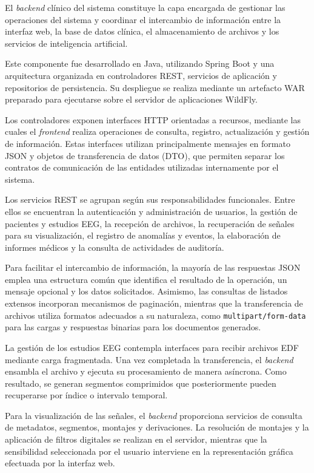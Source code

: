 El \textit{backend} clínico del sistema constituye la capa
encargada de gestionar las operaciones del sistema y
coordinar el intercambio de información entre la interfaz
web, la base de datos clínica, el almacenamiento de
archivos y los servicios de inteligencia artificial.

Este componente fue desarrollado en Java, utilizando
Spring Boot y una arquitectura organizada en controladores
REST, servicios de aplicación y repositorios de
persistencia. Su despliegue se realiza mediante un
artefacto WAR preparado para ejecutarse sobre el
servidor de aplicaciones WildFly.

Los controladores exponen interfaces HTTP orientadas
a recursos, mediante las cuales el \textit{frontend} realiza
operaciones de consulta, registro, actualización y
gestión de información. Estas interfaces utilizan
principalmente mensajes en formato JSON y objetos
de transferencia de datos (DTO), que permiten
separar los contratos de comunicación de las
entidades utilizadas internamente por el sistema.

Los servicios REST se agrupan según sus
responsabilidades funcionales. Entre ellos se
encuentran la autenticación y administración de
usuarios, la gestión de pacientes y estudios EEG,
la recepción de archivos, la recuperación de señales
para su visualización, el registro de anomalías y
eventos, la elaboración de informes médicos y
la consulta de actividades de auditoría.

Para facilitar el intercambio de información,
la mayoría de las respuestas JSON emplea una
estructura común que identifica el resultado de
la operación, un mensaje opcional y los datos
solicitados. Asimismo, las consultas de listados
extensos incorporan mecanismos de paginación,
mientras que la transferencia de archivos utiliza
formatos adecuados a su naturaleza, como
\texttt{multipart/form-data} para las cargas
y respuestas binarias para los documentos generados.

La gestión de los estudios EEG contempla interfaces
para recibir archivos EDF mediante carga
fragmentada. Una vez completada la transferencia,
el \textit{backend} ensambla el archivo y ejecuta su
procesamiento de manera asíncrona. Como resultado,
se generan segmentos comprimidos que posteriormente
pueden recuperarse por índice o intervalo temporal.

Para la visualización de las señales, el \textit{backend}
proporciona servicios de consulta de metadatos,
segmentos, montajes y derivaciones. La resolución
de montajes y la aplicación de filtros digitales
se realizan en el servidor, mientras que la
sensibilidad seleccionada por el usuario interviene
en la representación gráfica efectuada por
la interfaz web.

